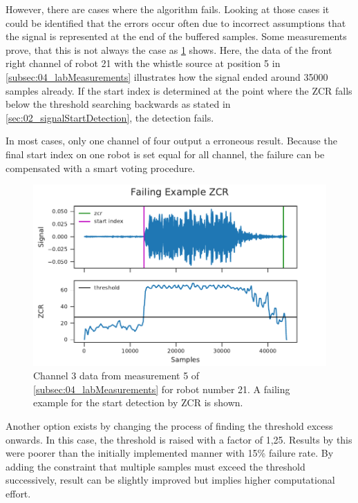 However, there are cases where the algorithm fails.
Looking at those cases it could be identified that
the errors occur often due to incorrect assumptions that
the signal is represented at the end of the buffered
samples.
Some measurements prove, that this is not always the case as \cref{fig:04_zcrFail} shows.
Here, the data of the front right channel of robot 21 with the whistle source
at position 5 in \cref{subsec:04_labMeasurements}
illustrates how the signal ended around 35000 samples already.
If the start index is determined at the point where the \ac{ZCR}
falls below the threshold searching backwards as stated in \cref{sec:02_signalStartDetection},
the detection fails.

In most cases, only one channel of four output a erroneous result.
Because the final start index on one robot is set equal for all channel,
the failure can be compensated with a smart voting procedure.
\begin{figure}[ht]
	\centering
	\includegraphics[]{figures/evaluation/zcr_fail}
	\caption{Channel 3 data from measurement 5 of \cref{subsec:04_labMeasurements}
		for robot number 21. A failing example for the start detection by \ac{ZCR}
		is shown.}
	\label{fig:04_zcrFail}
\end{figure}

Another option exists by changing the process of finding the
threshold excess onwards.
In this case, the threshold is raised with a factor of 1,25.
Results by this were poorer than the initially implemented manner
with 15\si{\percent} failure rate.
By adding the constraint that multiple samples must exceed the
threshold successively, result can be slightly improved but implies higher
computational effort.

